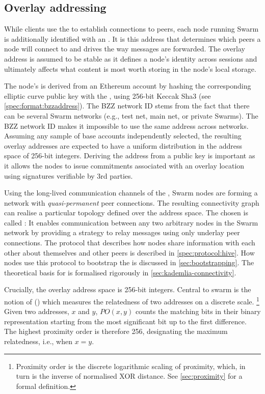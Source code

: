 \subsection{Overlay addressing}\label{sec:overlay-addressing} 
\green{}

While clients use the  to establish connections to peers, each node running Swarm is additionally identified with an . It is this address that determines which peers a node will connect to and drives the way messages are forwarded. The overlay address is assumed to be stable as it defines a node's identity across sessions and ultimately affects what content is most worth storing in the node's local storage.

The node's  is derived from an Ethereum account by hashing the corresponding elliptic curve public key with the , using 256-bit Keccak Sha3 (see \ref{spec:format:bzzaddress}). The BZZ network ID stems from the fact that there can be several Swarm networks (e.g., test net, main net, or private Swarms). The BZZ network ID makes it impossible to use the same address across networks. Assuming any sample of base accounts independently selected, the resulting overlay addresses are expected to have a uniform distribution in the address space of 256-bit integers. Deriving the address from a public key is important as it allows the nodes to issue commitments associated with an overlay location using signatures verifiable by 3rd parties. 

Using the long-lived communication channels of the , Swarm nodes are forming a network with \emph{quasi-permanent} peer connections. The resulting connectivity graph can realise a particular topology defined over the address space. The  chosen is called : It enables communication between any two arbitrary nodes in the Swarm network by providing a strategy to relay messages using only underlay peer connections. The protocol that describes how nodes share information with each other about themselves and other peers is described in \ref{spec:protocol:hive}. How nodes use this protocol to bootstrap the  is discussed in \ref{sec:bootstrapping}. The  theoretical basis for  is formalised rigorously in \ref{sec:kademlia-connectivity}. 

Crucially, the overlay address space is 256-bit integers. Central to swarm is the notion of  () which measures the relatedness of two addresses on  a discrete scale.%
%
\footnote{Proximity order is the discrete logarithmic scaling of proximity, which, in turn is the inverse of normalised XOR distance. See \ref{sec:proximity} for a formal definition.}
%
Given two addresses, $x$ and $y$, $\mathit{PO}(x,y)$ counts the matching bits in their binary representation starting from the most significant bit up to the first difference. The highest proximity order is therefore 256, designating the maximum relatedness, i.e., when $x=y$.

